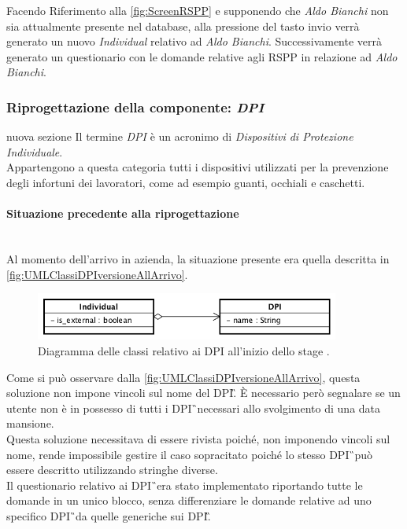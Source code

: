	Facendo Riferimento alla \autoref{fig:ScreenRSPP} e  supponendo che \textit{Aldo Bianchi} non sia attualmente presente nel database, alla pressione del tasto invio verrà generato un nuovo \textit{Individual} relativo ad \textit{Aldo Bianchi}. Successivamente verrà generato un questionario con le domande relative agli RSPP in relazione ad \textit{Aldo Bianchi}.
	
\newpage
\subsubsection{Riprogettazione della componente: \textit{DPI}}
nuova sezione
Il termine \textit{DPI} è un acronimo di \textit{Dispositivi di Protezione Individuale}. \\
Appartengono a questa categoria tutti i dispositivi utilizzati per la prevenzione degli infortuni dei lavoratori, come ad esempio guanti, occhiali e caschetti.\\

\paragraph*{Situazione precedente alla riprogettazione} \mbox{} \\
Al momento dell'arrivo in azienda, la situazione presente era quella descritta in \autoref{fig:UMLClassiDPIversioneAllArrivo}.
	\begin{figure}[H]
		\begin{center}
			\includegraphics[width=10cm]{Pics/UMLClassiDPIversioneAllArrivo.png}
			\caption{
			Diagramma delle classi relativo ai DPI all'inizio dello stage .}
			\label{fig:UMLClassiDPIversioneAllArrivo}
		\end{center}
	\end{figure}


Come si può osservare dalla \autoref{fig:UMLClassiDPIversioneAllArrivo}, questa soluzione non impone vincoli sul nome del \gls{DPI}\G.
È necessario però segnalare se un utente non è in possesso di tutti i \gls{DPI}\G\ necessari allo svolgimento di una data mansione.\\
Questa soluzione necessitava di essere rivista poiché, non imponendo vincoli sul nome, rende impossibile gestire il caso sopracitato poiché lo stesso \gls{DPI}\G\ può essere descritto utilizzando stringhe diverse.\\
Il questionario relativo ai \gls{DPI}\G\ era stato implementato riportando tutte le domande in un unico blocco, senza differenziare le domande relative ad uno specifico \gls{DPI}\G\ da quelle generiche sui \gls{DPI}\G.

